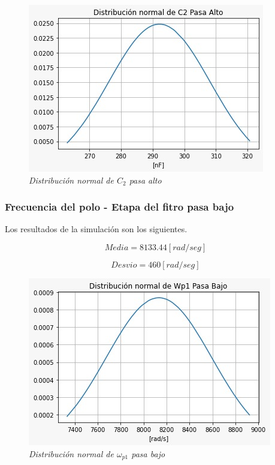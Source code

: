 \documentclass[12pt,A4paper,titlepage]{article}
\begin{document}
\begin{figure}[!h] 
  \centering
  \includegraphics[scale=0.7]{Imagenes/Distribución normal de C2 pasa alto.png}
  \caption{\textit{Distribución normal de \(C_2\) pasa alto}}
\end{figure}

\newpage
\subsubsection{Frecuencia del polo - Etapa del fitro pasa bajo}
\hspace{1mm} Los resultados de la simulación son los siguientes.

\begin{equation}
    \boxed{Media = 8133.44 [rad/seg]}   
\end{equation}

\begin{equation}
    \boxed{Desvio = 460 [rad/seg]}
\end{equation}

\begin{figure}[!h] 
  \centering
  \includegraphics[scale=0.7]{Imagenes/Distribución normal de Wp1 pasa bajo.png}
  \caption{\textit{Distribución normal de \(\omega_{p1}\) pasa bajo}}
\end{figure}
\end{document}
